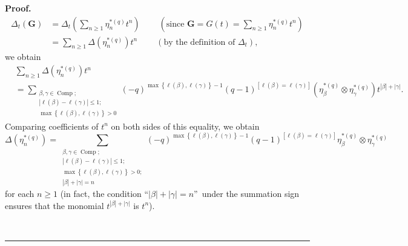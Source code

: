 \documentclass[numbers=enddot,12pt,final,onecolumn,notitlepage]{scrartcl}%
\theoremstyle{definition}
\newenvironment{proof}[1][Proof]{\noindent\textbf{#1.} }{\ \rule{0.5em}{0.5em}}
\let\sumnonlimits\sum
\renewcommand{\sum}{\sumnonlimits\limits}
\begin{document}
\begin{proof}
\begin{align*}
\Delta_{t}\left(  \mathbf{G}\right)   &  =\Delta_{t}\left(  \sum_{n\geq1}%
\eta_{n}^{\ast\left(  q\right)  }t^{n}\right)  \ \ \ \ \ \ \ \ \ \ \left(
\text{since }\mathbf{G}=G\left(  t\right)  =\sum_{n\geq1}\eta_{n}^{\ast\left(
q\right)  }t^{n}\right) \\
&  =\sum_{n\geq1}\Delta\left(  \eta_{n}^{\ast\left(  q\right)  }\right)
t^{n}\ \ \ \ \ \ \ \ \ \ \left(  \text{by the definition of }\Delta
_{t}\right)  ,
\end{align*}
we obtain%
\begin{align*}
&  \sum_{n\geq1}\Delta\left(  \eta_{n}^{\ast\left(  q\right)  }\right)
t^{n}\\
&  =\sum_{\substack{\beta,\gamma\in\operatorname*{Comp};\\\left\vert
\ell\left(  \beta\right)  -\ell\left(  \gamma\right)  \right\vert \leq
1;\\\max\left\{  \ell\left(  \beta\right)  ,\ell\left(  \gamma\right)
\right\}  >0}}\left(  -q\right)  ^{\max\left\{  \ell\left(  \beta\right)
,\ell\left(  \gamma\right)  \right\}  -1}\left(  q-1\right)  ^{\left[
\ell\left(  \beta\right)  =\ell\left(  \gamma\right)  \right]  }\left(
\eta_{\beta}^{\ast\left(  q\right)  }\otimes\eta_{\gamma}^{\ast\left(
q\right)  }\right)  t^{\left\vert \beta\right\vert +\left\vert \gamma
\right\vert }.
\end{align*}
Comparing coefficients of $t^{n}$ on both sides of this equality, we obtain%
\begin{equation}
\Delta\left(  \eta_{n}^{\ast\left(  q\right)  }\right)  =\sum_{\substack{\beta
,\gamma\in\operatorname*{Comp};\\\left\vert \ell\left(  \beta\right)
-\ell\left(  \gamma\right)  \right\vert \leq1;\\\max\left\{  \ell\left(
\beta\right)  ,\ell\left(  \gamma\right)  \right\}  >0;\\\left\vert
\beta\right\vert +\left\vert \gamma\right\vert =n}}\left(  -q\right)
^{\max\left\{  \ell\left(  \beta\right)  ,\ell\left(  \gamma\right)  \right\}
-1}\left(  q-1\right)  ^{\left[  \ell\left(  \beta\right)  =\ell\left(
\gamma\right)  \right]  }\eta_{\beta}^{\ast\left(  q\right)  }\otimes
\eta_{\gamma}^{\ast\left(  q\right)  } \label{pf.thm.Deltaetastara.at}%
\end{equation}
for each $n\geq1$ (in fact, the condition \textquotedblleft$\left\vert
\beta\right\vert +\left\vert \gamma\right\vert =n$\textquotedblright\ under
the summation sign ensures that the monomial $t^{\left\vert \beta\right\vert
+\left\vert \gamma\right\vert }$ is $t^{n}$).


\end{proof}
\end{document}

